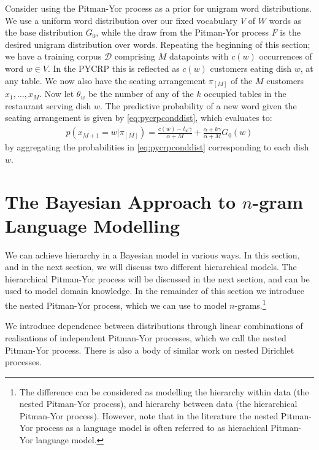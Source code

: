 Consider using the Pitman-Yor process as a prior for unigram word distributions. We use a uniform word distribution over our fixed vocabulary $V$ of $W$ words as the base distribution $G_0$, while the draw from the Pitman-Yor process $F$ is the desired unigram distribution over words. Repeating the beginning of this section; we have  a training corpus $\mathcal{D}$ comprising $M$ datapoints with $c(w)$ occurrences of word $w\in V$. In the PYCRP this is reflected as $c(w)$ customers eating dish $w$, at any table. We now also have the seating arrangement $\pi_{[M]}$ of the $M$ customers $x_1, \ldots, x_M$. Now let $\theta_w$ be the number of any of the $k$ occupied tables in the restaurant serving dish $w$. The predictive probability of a new word given the seating arrangement is given by \cref{eq:pycrpconddist}, which evaluates to:
\begin{align}
	p(x_{M+1} = w | \pi_{[M]}) = \frac{c(w)-t_w\gamma}{\alpha+M}+\frac{\alpha+k\gamma}{\alpha+M}G_0(w)
\end{align}
by aggregating the probabilities in \cref{eq:pycrpconddist} corresponding to each dish $w$. 


\section{The Bayesian Approach to $n$-gram Language Modelling}

We can achieve hierarchy in a Bayesian model in various ways. In this section, and in the next section, we will discuss two different hierarchical models. The hierarchical Pitman-Yor process will be discussed in the next section, and can be used to model domain knowledge. In the remainder of this section we introduce the nested Pitman-Yor process, which we can use to model $n$-grams.\footnote[][-24em]{The difference can be considered as modelling the hierarchy within data (the nested Pitman-Yor process), and hierarchy between data (the hierarchical Pitman-Yor process). However, note that in the literature the nested Pitman-Yor process as a language model is often referred to as hierachical Pitman-Yor language model.} 

We introduce dependence between distributions through linear combinations of realisations of independent Pitman-Yor processes, which we call the nested Pitman-Yor process.\cite[-19em]{Teh2006AHierarchical,Teh2006ATechnical} There is also a body of similar work on nested Dirichlet processes.\cite[-9em]{Blei2010The,Rodriguez2008The}

